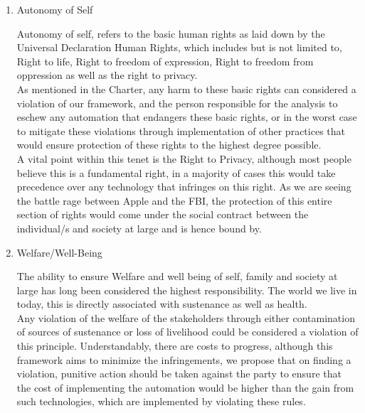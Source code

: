 \begin{enumerate}
\item Autonomy of Self
\begin{pointenv}
Autonomy of self, refers to the basic human rights as laid down by the Universal Declaration Human Rights, which includes but is not limited to, Right to life, Right to freedom of expression, Right to freedom from oppression as well as the right to privacy.\\
As mentioned in the Charter, any harm to these basic rights can considered a violation of our framework, and the person responsible for the analysis to eschew any automation that endangers these basic rights, or in the worst case to mitigate these violations through implementation of other practices that would ensure protection of these rights to the highest degree possible.\\
A vital point within this tenet is the Right to Privacy, although most people believe this is a fundamental right, in a majority of  cases this would take precedence over any technology that infringes on this right. As we are seeing the battle rage between Apple and the FBI, the protection of this entire section of rights would come under the social contract between the individual/s and society at large and is hence bound by. 
\end{pointenv}

\item Welfare/Well-Being
\begin{pointenv}
The ability to ensure Welfare and well being of self, family and society at large has long been considered the highest responsibility. The world we live in today, this is directly associated with sustenance as well as health.\\
Any violation of the welfare of the stakeholders through either contamination of sources of sustenance or loss of livelihood could be considered a violation of this principle. Understandably, there are costs to progress, although this framework aims to minimize the infringements, we propose that on finding a violation, punitive action should be taken against the party to ensure that the cost of implementing the automation would be higher than the gain from such technologies, which are implemented by violating these rules.
\end{pointenv}
\end{enumerate}

